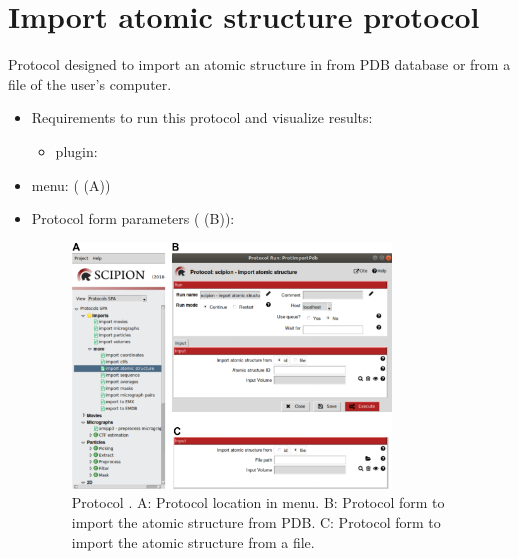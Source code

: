\section{Import atomic structure protocol}
\label{app:importAtomicStructure}%
Protocol designed to import an atomic structure in \scipion from PDB database or from a file of the user's computer.
   
 \begin{itemize}
  \item Requirements to run this protocol and visualize results:
    \begin{itemize}
        \item \scipion plugin: 
    \end{itemize}
  \item \scipion menu:
   ( (A))
  
  \item Protocol form parameters ( (B)):
  
  \begin{figure}[H]
    \centering 
    \captionsetup{width=.7\linewidth} 
    \includegraphics[width=0.80\textwidth]{Images_appendix/Fig110.pdf}
    \caption{Protocol . A: Protocol location in \scipion menu. B: Protocol form to import the atomic structure from PDB. C: Protocol form to import the atomic structure from a file.}
    \label{fig:app_protocol_atomicStructure_1}
   \end{figure}


\end{itemize}
